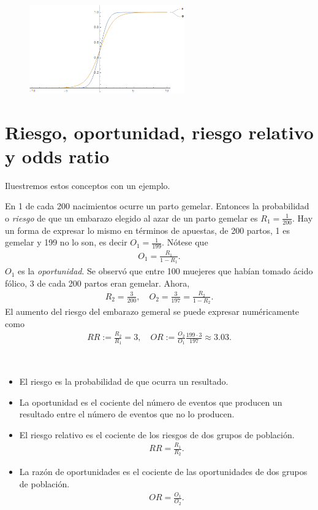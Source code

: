 \begin{figure}[h]
    \centering
    \includegraphics[width=0.6\textwidth]{imagenes3/logit.png}
\end{figure}

\section{Riesgo, oportunidad, riesgo relativo y odds ratio}
\noindent Iluestremos estos conceptos con un ejemplo.
\begin{ejemplo}
    En 1 de cada 200 nacimientos ocurre un parto gemelar. Entonces la probabilidad o \textit{riesgo} de que un embarazo elegido al azar de un parto gemelar es $R_1 = \frac{1}{200}$. Hay un forma de expresar lo mismo en términos de apuestas, de 200 partos, 1 es gemelar y 199 no lo son, es decir $O_1 = \frac{1}{199}$. Nótese que
\begin{align*}
    O_1 = \frac{R_1}{1-R_1}.
\end{align*}
$O_1$ es la \textit{oportunidad}. Se observó que entre 100 muejeres que habían tomado ácido fólico, 3 de cada 200 partos eran gemelar. Ahora, 
\begin{align*}
    R_2 = \frac{3}{200}, \quad O_2 = \frac{3}{197} = \frac{R_2}{1-R_2}.
\end{align*}
El aumento del riesgo del embarazo gemeral se puede expresar numéricamente como
\begin{align*}
   RR :=  \frac{R_2}{R_1} = 3, \quad OR:= \frac{O_2}{O_1} \frac{199 \cdot 3}{197} \approx 3.03.
\end{align*}
\end{ejemplo}

\begin{defi} \
    \begin{itemize}
        \item El riesgo es la probabilidad de que ocurra un resultado.
        \item La oportunidad es el cociente del número de eventos que producen un resultado entre el número de eventos que no lo producen.
        \item  El riesgo relativo es el cociente de los riesgos de dos grupos de población.
        \begin{align*}
            RR = \frac{R_1}{R_2}.
        \end{align*}
        \item La razón de oportunidades es el cociente de las oportunidades de dos grupos de población.
        \begin{align*}
            OR = \frac{O_1}{O_2}.
        \end{align*}
    \end{itemize}
\end{defi}

